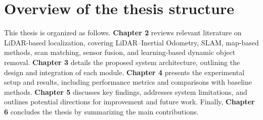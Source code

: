
\section{Overview of the thesis structure}
This thesis is organized as follows. \textbf{Chapter 2} reviews relevant literature on LiDAR-based localization, covering LiDAR–Inertial Odometry, SLAM, map-based methods, scan matching, sensor fusion, and learning-based dynamic object removal. \textbf{Chapter 3} details the proposed system architecture, outlining the design and integration of each module. \textbf{Chapter 4} presents the experimental setup and results, including performance metrics and comparisons with baseline methods. \textbf{Chapter 5} discusses key findings, addresses system limitations, and outlines potential directions for improvement and future work. Finally, \textbf{Chapter 6} concludes the thesis by summarizing the main contributions.





